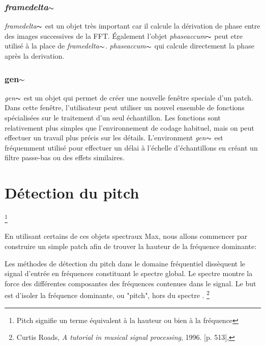 \subsubsection{\textit{framedelta}$\thicksim$}
    
    \textit{framedelta}$\thicksim$ est un objet très important car il calcule la dérivation de phase entre des images successives de la FFT. Également l'objet \textit{phaseaccum}$\thicksim$ peut etre utilisé à la place de \textit{framedelta}$\thicksim$. \textit{phaseaccum}$\thicksim$ qui calcule directement la phase après la derivation.

\subsubsection{gen$\thicksim$}
    
    \textit{gen}$\thicksim$ est un objet qui permet de créer une nouvelle fenêtre speciale d’un patch. Dans cette fenêtre, l'utilisateur peut utiliser un nouvel ensemble de fonctions spécialisées sur le traitement d'un seul échantillon. Les fonctions sont relativement plus simples que l'environnement de codage habituel, mais on peut effectuer un travail plus précis sur les détails. L’environment \textit{gen}$ \thicksim $ est fréquemment utilisé pour effectuer un délai à l'échelle d'échantillons en créant un filtre passe-bas ou des effets similaires.

\section{Détection du pitch}\footnote{Pitch signifie un terme équivalent à la hauteur ou bien à la fréquence}

En utilisant certains de ces objets spectraux Max, nous allons commencer par construire un simple patch afin de trouver la hauteur de la fréquence dominante:

     \begin{displayquote}
         \guillemotleft Les méthodes de détection du pitch dans le domaine fréquentiel dissèquent le signal d'entrée en fréquences constituant le spectre global. Le spectre montre la force des différentes composantes des fréquences contenues dans le signal. Le but est d’isoler la fréquence dominante, ou "pitch", hors du spectre \guillemotright. \footnote{Curtis Roads, \textit{A tutorial in musical signal processing}, 1996. [p. 513], \nocite{Roads1996}}
     \end{displayquote}

